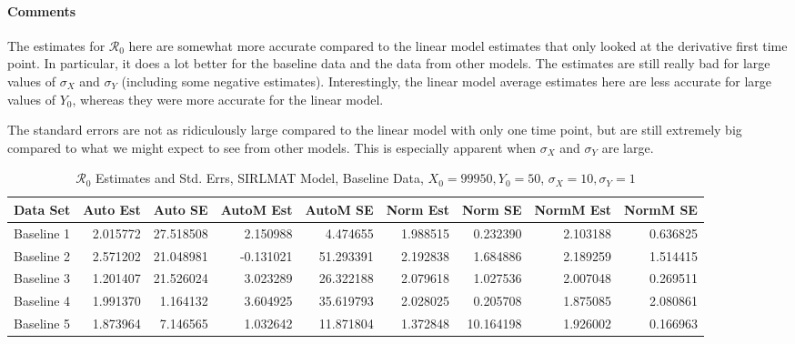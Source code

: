 \documentclass[12pt]{article}
\newcommand{\rr}{\ensuremath{\mathcal{R}_0}}
\begin{document}
\paragraph{Comments}

The estimates for $\rr$ here are somewhat more accurate compared to the linear model estimates that only looked at the derivative first time point. In particular, it does a lot better for the baseline data and the data from other models. The estimates are still really bad for large values of $\sigma_X$ and $\sigma_Y$ (including some negative estimates). Interestingly, the linear model average estimates here are less accurate for large values of $Y_0$, whereas they were more accurate for the linear model.

The standard errors are not as ridiculously large compared to the linear model with only one time point, but are still extremely big compared to what we might expect to see from other models. This is especially apparent when $\sigma_X$ and $\sigma_Y$ are large.

\begin{table}[H]
	
	\caption{$\rr$ Estimates and Std. Errs, SIRLMAT Model,
		Baseline Data, $X_0 = 99950, Y_0 = 50$, 
		$\sigma_X = 10, \sigma_Y = 1$}
	\begin{footnotesize}
		\hskip -1cm
		\begin{tabular}{l|r|r|r|r|r|r|r|r}
			\hline
			Data Set & Auto Est & Auto SE & AutoM Est & AutoM SE & Norm Est & Norm SE & NormM Est & NormM SE\\
			\hline
			Baseline 1 & 2.015772 & 27.518508 & 2.150988 & 4.474655 & 1.988515 & 0.232390 & 2.103188 & 0.636825\\
			\hline
			Baseline 2 & 2.571202 & 21.048981 & -0.131021 & 51.293391 & 2.192838 & 1.684886 & 2.189259 & 1.514415\\
			\hline
			Baseline 3 & 1.201407 & 21.526024 & 3.023289 & 26.322188 & 2.079618 & 1.027536 & 2.007048 & 0.269511\\
			\hline
			Baseline 4 & 1.991370 & 1.164132 & 3.604925 & 35.619793 & 2.028025 & 0.205708 & 1.875085 & 2.080861\\
			\hline
			Baseline 5 & 1.873964 & 7.146565 & 1.032642 & 11.871804 & 1.372848 & 10.164198 & 1.926002 & 0.166963\\
			\hline
		\end{tabular}
	\end{footnotesize}
\end{table}
\end{document}

